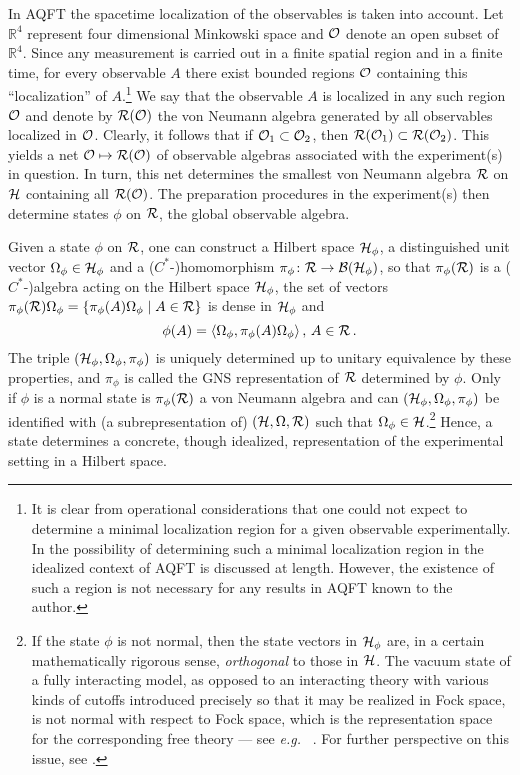 \documentclass[12pt]{article}
\newcommand{\eg}{{\it e.g.\ }}
\def\Bs{{\cal B}}
\def\Hs{{\cal H}}
\def\Os{{\cal O}}
\def\Rs{{\cal R}}
\def\RR{{\mathbb R}}
\def\C{$C^{\ast}$-}
\begin{document}
     In AQFT the spacetime localization of the observables is taken
into account. Let $\RR^4$ represent four dimensional Minkowski space
and $\Os$ denote an open subset of $\RR^4$. Since any measurement is
carried out in a finite spatial region and in a finite time, for every
observable $A$ there exist bounded regions $\Os$ containing this
``localization'' of $A$.\footnote{It is clear from operational 
considerations that one could not expect to determine a minimal 
localization region for a given observable experimentally. In \cite{Ku3}
the possibility of determining such a minimal localization region 
in the idealized context of AQFT is discussed at length. However, the
existence of such a region is not necessary for any results in AQFT
known to the author.} We say that the observable $A$ is localized in 
any such region $\Os$ and denote by $\Rs(\Os)$ the von Neumann algebra
generated by all observables localized in $\Os$.  Clearly, it follows
that if $\Os_1 \subset \Os_2$, then $\Rs(\Os_1) \subset
\Rs(\Os_2)$. This yields a net $\Os \mapsto \Rs(\Os)$ of observable
algebras associated with the experiment(s) in question. In turn, this
net determines the smallest von Neumann algebra $\Rs$ on $\Hs$
containing all $\Rs(\Os)$.  The preparation procedures in the
experiment(s) then determine states $\phi$ on $\Rs$, the global 
observable algebra.

     Given a state $\phi$ on $\Rs$, one can construct \cite{Em,KaRi1,Tak1} 
a Hilbert space $\Hs_{\phi}$, a distinguished unit vector 
$\Omega_\phi \in \Hs_{\phi}$ and a (\C)homomorphism 
$\pi_{\phi}\colon \Rs \to \Bs(\Hs_{\phi})$, so that 
$\pi_{\phi}(\Rs)$ is a (\C)algebra acting on the Hilbert space 
$\Hs_{\phi}$, the set of vectors 
$\pi_{\phi}(\Rs)\Omega_\phi = \{ \pi_\phi(A)\Omega_\phi \mid A \in \Rs \}$ 
is dense in $\Hs_\phi$ and
%
$$\phi(A) = \langle \Omega_\phi, \pi_\phi(A) \Omega_\phi \rangle \, ,
\, A \in \Rs \, .$$
%
The triple $(\Hs_\phi,\Omega_\phi,\pi_\phi)$ is
uniquely determined up to unitary equivalence by these properties, and
$\pi_{\phi}$ is called the GNS representation of $\Rs$ determined by
$\phi$. Only if $\phi$ is a normal state is $\pi_{\phi}(\Rs)$ a
von Neumann algebra and can $(\Hs_\phi,\Omega_\phi,\pi_\phi)$ be
identified with (a subrepresentation of) $(\Hs,\Omega,\Rs)$ such that
$\Omega_\phi \in \Hs$.\footnote{If the state $\phi$ is not normal, then
the state vectors in $\Hs_\phi$ are, in a certain mathematically rigorous
sense, {\it orthogonal} to those in $\Hs$. The vacuum state of a fully
interacting model, as opposed to an interacting theory with various kinds of
cutoffs introduced precisely so that it may be realized in Fock space, 
is not normal with respect to Fock space, which is the
representation space for the corresponding free theory --- see \eg 
\cite{GlJa,BLT}. For further perspective on this issue, see \cite{SuvN}.} 
Hence, a state determines a concrete, though idealized, representation of 
the experimental setting in a Hilbert space.
\end{document}
